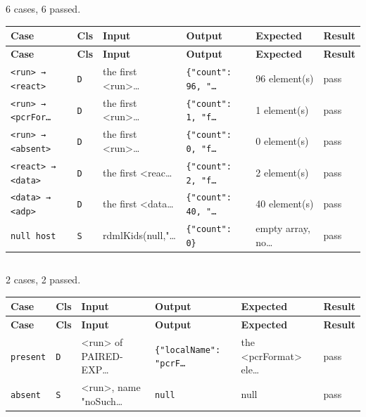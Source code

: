 \subsection*{}
{\small 6 cases, 6 passed.}\par
{\small
\begin{xltabular}{\linewidth}{|X|l|l|l|l|l|}
\toprule \textbf{Case} & \textbf{Cls} & \textbf{Input} & \textbf{Output} & \textbf{Expected} & \textbf{Result} \\\midrule\endfirsthead
\toprule \textbf{Case} & \textbf{Cls} & \textbf{Input} & \textbf{Output} & \textbf{Expected} & \textbf{Result} \\\midrule\endhead
\texttt{<run> → <react>} & \texttt{D} & the first <run>… & \texttt{\{"count": 96, "…} & 96 element(s) & pass \\
\texttt{<run> → <pcrFor…} & \texttt{D} & the first <run>… & \texttt{\{"count": 1, "f…} & 1 element(s) & pass \\
\texttt{<run> → <absent>} & \texttt{D} & the first <run>… & \texttt{\{"count": 0, "f…} & 0 element(s) & pass \\
\texttt{<react> → <data>} & \texttt{D} & the first <reac… & \texttt{\{"count": 2, "f…} & 2 element(s) & pass \\
\texttt{<data> → <adp>} & \texttt{D} & the first <data… & \texttt{\{"count": 40, "…} & 40 element(s) & pass \\
\texttt{null host} & \texttt{S} & rdmlKids(null,"… & \texttt{\{"count": 0\}} & empty array, no… & pass \\
\bottomrule
\end{xltabular}}

\subsection*{}
{\small 2 cases, 2 passed.}\par
{\small
\begin{xltabular}{\linewidth}{|X|l|l|l|l|l|}
\toprule \textbf{Case} & \textbf{Cls} & \textbf{Input} & \textbf{Output} & \textbf{Expected} & \textbf{Result} \\\midrule\endfirsthead
\toprule \textbf{Case} & \textbf{Cls} & \textbf{Input} & \textbf{Output} & \textbf{Expected} & \textbf{Result} \\\midrule\endhead
\texttt{present} & \texttt{D} & <run> of PAIRED-EXP… & \texttt{\{"localName": "pcrF…} & the <pcrFormat> ele… & pass \\
\texttt{absent} & \texttt{S} & <run>, name "noSuch… & \texttt{null} & null & pass \\
\bottomrule
\end{xltabular}}

